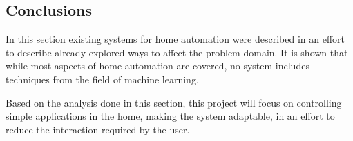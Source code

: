 \subsection{Conclusions}
In this section existing systems for home automation were described in an effort to describe already explored ways to affect the problem domain. It is shown that while most aspects of home automation are covered, no system includes techniques from the field of machine learning.

Based on the analysis done in this section, this project will focus on controlling simple applications in the home, making the system adaptable, in an effort to reduce the interaction required by the user.
